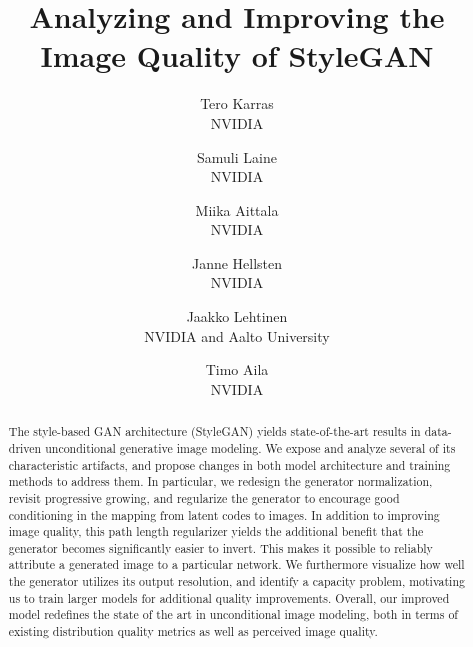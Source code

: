 \documentclass[10pt,twocolumn,letterpaper]{article}
\newif\ifforceplain\forceplainfalse %
\newif\ifarxiv
\newcommand{\FINAL}[2][]{#2} %
\begin{document}
\title{Analyzing and Improving the Image Quality of StyleGAN}

\author{Tero Karras\\
NVIDIA%
\and
Samuli Laine\\
NVIDIA%
\and
Miika Aittala\\
NVIDIA%
\and
Janne Hellsten\\
NVIDIA%
\and
Jaakko Lehtinen\\
NVIDIA and Aalto University%
\and
Timo Aila\\
NVIDIA%
}

\maketitle

\ifcvprfinal\thispagestyle{empty}\fi
\ifarxiv
\pagestyle{plain}\thispagestyle{plain}
\fi

\ifforceplain\thispagestyle{plain}\pagestyle{plain}\fi

\ifarxiv
	\newcommand{\refappimagequality}{Appendix~\ref{app:imagequality}}
	\newcommand{\refappimplementation}{Appendix~\ref{app:implementation}}
	\newcommand{\refappregularization}{Appendix~\ref{app:regularization}}
	\newcommand{\refappprojectiondetails}{Appendix~\ref{app:projectiondetails}}
	\newcommand{\refapplsuncomparison}{Figures~\ref{fig:catscomparison} and~\ref{fig:carscomparison}}
	\newcommand{\refappspectralnorm}{Appendix~\ref{app:spectralnorm}}
	\newcommand{\refapppower}{Appendix~\ref{app:power}}
\else
	\newcommand{\refappimagequality}{Appendix~A}
	\newcommand{\refappimplementation}{Appendix~B}
	\newcommand{\refappregularization}{Appendix~C}
	\newcommand{\refappprojectiondetails}{Appendix~D}
	\newcommand{\refapplsuncomparison}{Figures~3 and 4 in the Supplement}
	\newcommand{\refappspectralnorm}{Appendix~E}
	\newcommand{\refapppower}{Appendix~F}
\fi
\newcommand{\reftablsun}{Table~\ref{tab:lsun}}

\begin{abstract}

The style-based GAN architecture (StyleGAN) yields state-of-the-art results in data-driven unconditional generative image modeling. 
We expose and analyze several of its characteristic artifacts, and propose changes in both model architecture and training methods to address them.
In particular, we redesign the generator normalization, revisit progressive growing, and regularize the generator to encourage good conditioning in the mapping from latent codes to images. 
In addition to improving image quality, this path length regularizer yields the additional benefit that the generator becomes significantly easier to invert.
\FINAL{This makes it possible to reliably attribute a generated image to a particular network.} 
We furthermore visualize how well the generator utilizes its output resolution, and identify a capacity problem, motivating us to train larger models for additional quality improvements. 
Overall, our improved model redefines the state of the art in unconditional image modeling, both in terms of existing distribution quality metrics as well as perceived image quality.

\end{abstract}
\end{document}
